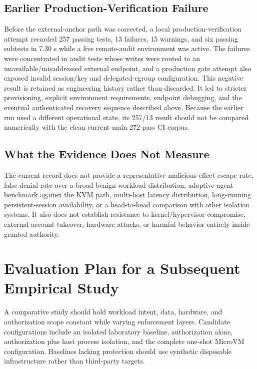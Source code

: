 \documentclass[journal]{IEEEtran}
\begin{document}
\subsection{Earlier Production-Verification Failure}
Before the external-anchor path was corrected, a local production-verification attempt recorded 257 passing tests, 13 failures, 15 warnings, and six passing subtests in 7.30 s while a live remote-audit environment was active. The failures were concentrated in audit tests whose writes were routed to an unavailable/misaddressed external endpoint, and a production gate attempt also exposed invalid session/key and delegated-cgroup configuration. This negative result is retained as engineering history rather than discarded. It led to stricter provisioning, explicit environment requirements, endpoint debugging, and the eventual authenticated recovery sequence described above. Because the earlier run used a different operational state, its 257/13 result should not be compared numerically with the clean current-main 272-pass CI corpus.

\subsection{What the Evidence Does Not Measure}
The current record does not provide a representative malicious-effect escape rate, false-denial rate over a broad benign workload distribution, adaptive-agent benchmark against the KVM path, multi-host latency distribution, long-running persistent-session availability, or a head-to-head comparison with other isolation systems. It also does not establish resistance to kernel/hypervisor compromise, external account takeover, hardware attacks, or harmful behavior entirely inside granted authority.

\section{Evaluation Plan for a Subsequent Empirical Study}
A comparative study should hold workload intent, data, hardware, and authorization scope constant while varying enforcement layers. Candidate configurations include an isolated laboratory baseline, authorization alone, authorization plus host process isolation, and the complete one-shot MicroVM configuration. Baselines lacking protection should use synthetic disposable infrastructure rather than third-party targets.
\end{document}
